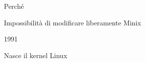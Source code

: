 \documentclass{beamer}
\begin{document}
\begin{frame}
\begin{minipage}{.55\linewidth}
\begin{block}{Perché}
\begin{itemize}
                    \begin{minipage}{.75\linewidth} Impossibilità di modificare liberamente Minix \end{minipage}
                    \pause
            \end{itemize}
        \end{block}
    \begin{block}{1991}
        \begin{minipage}{.2\linewidth}
        \end{minipage}
        \begin{minipage}{.75\linewidth}
        Nasce il kernel Linux
        \end{minipage}
    \end{block}
    \end{minipage}
\end{frame}


\end{document}
